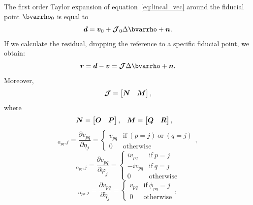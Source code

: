 \documentclass[useAMS,usenatbib]{mn2e}
\newcommand{\br}{\bmath{r}}
\newcommand{\bd}{\bmath{d}}
\newcommand{\bv}{\bmath{v}}
\newcommand{\bn}{\bmath{n}}
\newcommand{\bN}{\bmath{N}}
\newcommand{\bM}{\bmath{M}}
\newcommand{\bO}{\bmath{O}}
\newcommand{\bP}{\bmath{P}}
\newcommand{\bQ}{\bmath{Q}}
\newcommand{\bR}{\bmath{R}}
\newcommand{\bmJ}{\bmath{\mathcal{J}}}
\begin{document}
The first order Taylor expansion of equation~\ref{eq:lincal_vec} around the fiducial point $\bvarrho_0$ is equal to
\begin{equation}
\label{eq:d_lin}
\bd = \bv_0 + \bmJ_0 \Delta \bvarrho  + \bn.
\end{equation}
If we calculate the residual, dropping the reference to a specific fiducial point, we obtain: 
\begin{equation}
\label{eq:r_lin}
\br = \bd - \bv = \bmJ \Delta \bvarrho + \bn.
\end{equation}
Moreover,
\begin{equation}
\label{eq:jac_upper_lincal}
\bmJ = \begin{bmatrix}
       \bN & \bM 
       \end{bmatrix},
\end{equation}
where
\begin{align}
\bN &= \begin{bmatrix} \bO & \bP \end{bmatrix}, & \bM &= \begin{bmatrix} \bQ & \bR \end{bmatrix}, 
\end{align}
\begin{equation}
 [\bO]_{\alpha_{pq},j} =  \frac{\partial v_{pq}}{\partial \eta_j} = \begin{cases} 
    v_{pq} &\textrm{if}~(p=j)~\textrm{or}~(q=j)\\
    0 & \textrm{otherwise}
   \end{cases},
\end{equation}
\begin{equation}
 [\bP]_{\alpha_{pq},j} =  \frac{\partial v_{pq}}{\partial \varphi_j} = \begin{cases}
                                                                        i v_{pq} &\textrm{if}~ p=j\\
                                                                        -i v_{pq} &\textrm{if}~ q=j \\
                                                                        0 & \textrm{otherwise} 
                                                                       \end{cases}
\end{equation}
\begin{equation}
 [\bQ]_{\alpha_{pq},j} =  \frac{\partial v_{pq}}{\partial \widetilde{\eta}_j} = \begin{cases} 
    v_{pq} &\textrm{if}~\phi_{pq}=j\\
    0 & \textrm{otherwise}
   \end{cases},
\end{equation}
\end{document}
